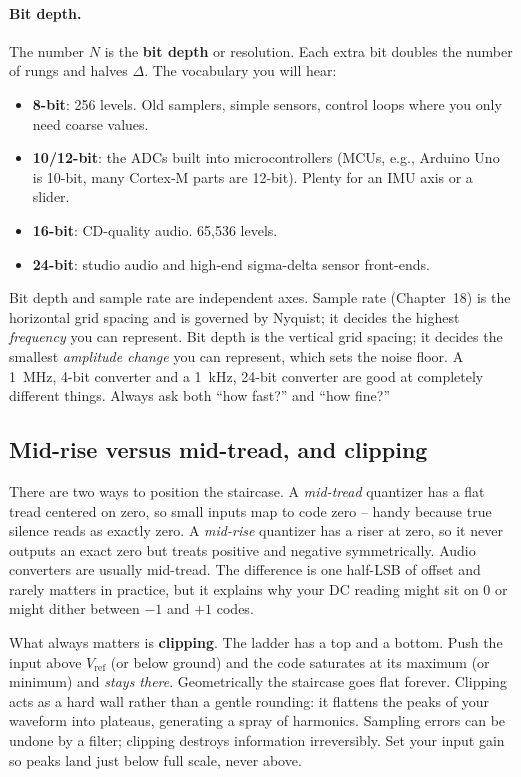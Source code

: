 \paragraph{Bit depth.} The number $N$ is the \textbf{bit depth} or resolution. Each extra bit
doubles the number of rungs and halves $\Delta$. The vocabulary you will hear:
\begin{itemize}
  \item \textbf{8-bit}: 256 levels. Old samplers, simple sensors, control loops where you only
        need coarse values.
  \item \textbf{10/12-bit}: the ADCs built into microcontrollers (MCUs, e.g., Arduino Uno is 10-bit,
        many Cortex-M parts are 12-bit). Plenty for an IMU axis or a slider.
  \item \textbf{16-bit}: CD-quality audio. 65{,}536 levels.
  \item \textbf{24-bit}: studio audio and high-end sigma-delta sensor front-ends.
\end{itemize}

\begin{trapbox}
Bit depth and sample rate are independent axes. Sample rate
(Chapter~18) is the horizontal grid spacing and is governed by Nyquist; it decides the highest
\emph{frequency} you can represent. Bit depth is the vertical grid spacing; it decides the
smallest \emph{amplitude change} you can represent, which sets the noise floor. A 1~MHz, 4-bit
converter and a 1~kHz, 24-bit converter are good at completely different things. Always ask both
``how fast?'' and ``how fine?''
\end{trapbox}

\subsection*{Mid-rise versus mid-tread, and clipping}
There are two ways to position the staircase. A \emph{mid-tread} quantizer has a flat tread
centered on zero, so small inputs map to code zero -- handy because true silence reads as exactly
zero. A \emph{mid-rise} quantizer has a riser at zero, so it never outputs an exact zero but
treats positive and negative symmetrically. Audio converters are usually mid-tread. The
difference is one half-LSB of offset and rarely matters in practice, but it explains why your DC
reading might sit on $0$ or might dither between $-1$ and $+1$ codes.

What always matters is \textbf{clipping}. The ladder has a top and a bottom. Push the input above
$V_{\mathrm{ref}}$ (or below ground) and the code saturates at its maximum (or minimum) and
\emph{stays there}. Geometrically the staircase goes flat forever. Clipping acts as a hard wall
rather than a gentle rounding: it flattens the peaks of your waveform into plateaus, generating a
spray of harmonics. Sampling errors can be undone by a filter; clipping destroys information
irreversibly. Set your input gain so peaks land just below full scale, never above.

